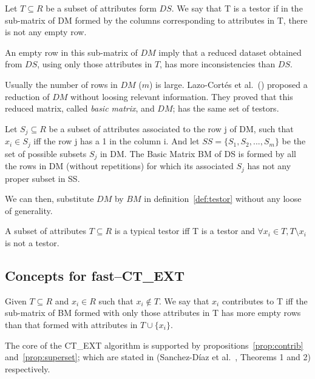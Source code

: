 \documentclass[citeauthoryear]{llncs}
\begin{document}
	\begin{definition}\label{def:testor}
		Let $T \subseteq R$ be a subset of attributes form $DS$. We say that T is a testor if in the sub-matrix
		of DM formed by the columns corresponding to attributes in T, there is not any empty row.
	\end{definition}
	
	An empty row in this sub-matrix of $DM$ imply that a reduced dataset obtained from $DS$, using only those attributes in $T$, has more inconsistencies than $DS$. 	
	
	Usually the number of rows in $DM$ ($m$) is large. Lazo-Cort\'es et al.~(\cite{Lazo2001}) proposed a reduction of $DM$ without loosing relevant information. They proved that this reduced matrix, called \textit{basic matrix}, and $DM$; has the same set of testors. 
	
	\begin{definition} \label{def:BM}
		Let $S_{j} \subseteq R$ be a subset of attributes associated to the row j of DM, such that $x_i \in S_{j}$ iff the row j has a 1 in the column i. And let $SS=\lbrace S_1, S_2,...,S_m  \rbrace$ be the set of possible subsets $S_{j}$ in DM. The Basic Matrix BM of DS is formed by all the rows in DM (without repetitions) for which its associated $S_{j}$ has not any proper subset in SS.
	\end{definition}
	
	
	We can then, substitute $DM$ by $BM$ in definition~\ref{def:testor} without any loose of generality. 
	
	\begin{definition}\label{def:TT}
		A subset of attributes $T \subseteq R$ is a typical testor iff T is a testor and $\forall x_i \in T, T \setminus x_i$ is not a testor. 
	\end{definition}
		
%	
\subsection{Concepts for fast--CT\_EXT}
%
		
	\begin{definition}\label{def:contrib}
		Given $T \subseteq R$ and $x_i \in R$ such that $x_i \notin T$. We say that $x_i$ contributes to T iff the sub-matrix of BM formed with only those attributes in T has more empty rows than that formed with attributes in $T \cup \lbrace x_i \rbrace$.
	\end{definition}	
	
	The core of the CT\_EXT algorithm is supported by propositions~\ref{prop:contrib} and~\ref{prop:superset}; which are stated in	(Sanchez-D\'iaz et al.~\cite{Sanchez2010}, Theorems 1 and 2) respectively.
	
\end{document}
